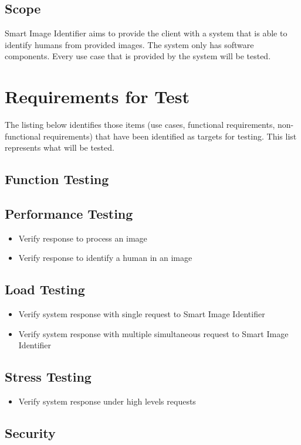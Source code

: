 \documentclass[a4paper,12pt]{report}
\begin{document}
	\subsection {Scope}
		Smart Image Identifier aims to provide the client with a system that is able to identify humans from provided images. The system only has software components.
		Every use case that is provided by the system will be tested.
		
\section {Requirements for Test}
	The listing below identifies those items (use cases, functional requirements, non-functional requirements) that have been identified as targets for testing. 
	This list represents what will be tested.
	
	\subsection {Function Testing}
	\subsection {Performance Testing}
		\begin {itemize}
			\item Verify response to process an image
			\item Verify response to identify a human in an image
		\end {itemize}
	\subsection {Load Testing}
		\begin {itemize}
			\item Verify system response with single request to Smart Image Identifier
			\item Verify system response with multiple simultaneous request to Smart Image Identifier
		\end {itemize}
	\subsection {Stress Testing}
		\begin {itemize}
			\item Verify system response under high levels requests
		\end {itemize}
	\subsection {Security}
	
\end{document}
